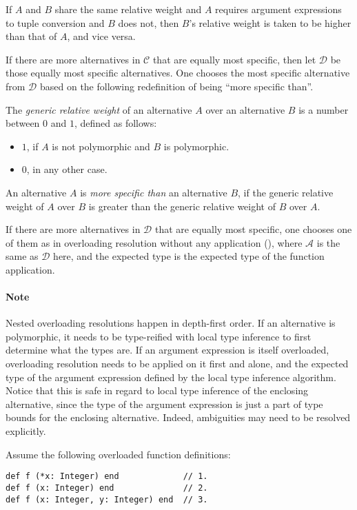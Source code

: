 If $A$ and $B$ share the same relative weight and $A$ requires argument expressions to tuple conversion and $B$ does not, then $B$'s relative weight is taken to be higher than that of $A$, and vice versa. 

If there are more alternatives in $\mathcal{C}$ that are equally most specific, then let $\mathcal{D}$ be those equally most specific alternatives. One chooses the most specific alternative from $\mathcal{D}$ based on the following redefinition of being ``more specific than''. 

\begin{definition}
The {\em generic relative weight} of an alternative $A$ over an alternative $B$ is a number between $0$ and $1$, defined as follows:
\begin{itemize}
  \item $1$, if $A$ is not polymorphic and $B$ is polymorphic. 
  \item $0$, in any other case. 
\end{itemize}
\end{definition}

An alternative $A$ is {\em more specific than} an alternative $B$, if the generic relative weight of $A$ over $B$ is greater than the generic relative weight of $B$ over $A$. 

If there are more alternatives in $\mathcal{D}$ that are equally most specific, one chooses one of them as in overloading resolution without any application (), where $\mathcal{A}$ is the same as $\mathcal{D}$ here, and the expected type is the expected type of the function application. 

\paragraph{Note}
Nested overloading resolutions happen in depth-first order. If an alternative is polymorphic, it needs to be type-reified with local type inference to first determine what the types are. If an argument expression is itself overloaded, overloading resolution needs to be applied on it first and alone, and the expected type of the argument expression defined by the local type inference algorithm. Notice that this is safe in regard to local type inference of the enclosing alternative, since the type of the argument expression is just a part of type bounds for the enclosing alternative. Indeed, ambiguities may need to be resolved explicitly. 

\example Assume the following overloaded function definitions:
\begin{lstlisting}
def f (*x: Integer) end             // 1.
def f (x: Integer) end              // 2.
def f (x: Integer, y: Integer) end  // 3.
\end{lstlisting}

